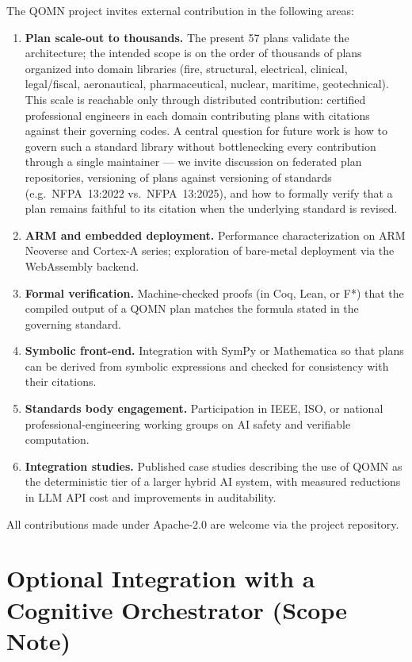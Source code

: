 \documentclass[11pt,a4paper]{article}
\begin{document}
The QOMN project invites external contribution in the following areas:

\begin{enumerate}[leftmargin=*]
\item \textbf{Plan scale-out to thousands.} The present 57 plans validate the architecture; the intended scope is on the order of thousands of plans organized into domain libraries (fire, structural, electrical, clinical, legal/fiscal, aeronautical, pharmaceutical, nuclear, maritime, geotechnical). This scale is reachable only through distributed contribution: certified professional engineers in each domain contributing plans with citations against their governing codes. A central question for future work is how to govern such a standard library without bottlenecking every contribution through a single maintainer --- we invite discussion on federated plan repositories, versioning of plans against versioning of standards (e.g.\ NFPA~13:2022 vs.\ NFPA~13:2025), and how to formally verify that a plan remains faithful to its citation when the underlying standard is revised.
\item \textbf{ARM and embedded deployment.} Performance characterization on ARM Neoverse and Cortex-A series; exploration of bare-metal deployment via the WebAssembly backend.
\item \textbf{Formal verification.} Machine-checked proofs (in Coq, Lean, or F*) that the compiled output of a QOMN plan matches the formula stated in the governing standard.
\item \textbf{Symbolic front-end.} Integration with SymPy or Mathematica so that plans can be derived from symbolic expressions and checked for consistency with their citations.
\item \textbf{Standards body engagement.} Participation in IEEE, ISO, or national professional-engineering working groups on AI safety and verifiable computation.
\item \textbf{Integration studies.} Published case studies describing the use of QOMN as the deterministic tier of a larger hybrid AI system, with measured reductions in LLM API cost and improvements in auditability.
\end{enumerate}

All contributions made under Apache-2.0 are welcome via the project repository.

\section{Optional Integration with a Cognitive Orchestrator (Scope Note)}
\label{sec:cognitive-integration}
\end{document}
